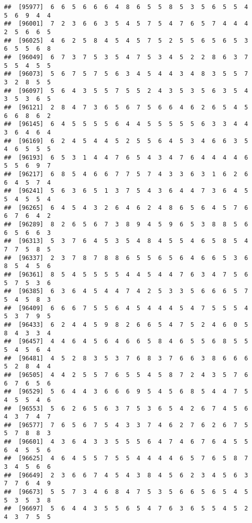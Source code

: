 \documentclass[
]{book}
\begin{document}
\begin{verbatim}
##  [95977]  6  6  5  6  6  6  4  8  6  5  5  8  5  3  5  6  5  5  4  5  6  9  4  4
##  [96001]  7  2  3  6  6  3  5  4  5  7  5  4  7  6  5  7  4  4  4  2  5  6  6  5
##  [96025]  4  6  2  5  8  4  5  4  5  7  5  2  5  5  6  5  6  5  3  6  5  5  6  8
##  [96049]  6  7  3  7  5  3  5  4  7  5  3  4  5  2  2  8  6  3  7  5  5  4  5  5
##  [96073]  5  6  7  5  7  5  6  3  4  5  4  4  3  4  8  3  5  5  7  3  2  8  5  5
##  [96097]  5  6  4  3  5  5  7  5  5  2  4  3  5  3  5  6  3  5  4  3  5  3  6  5
##  [96121]  2  8  4  7  3  6  5  6  7  5  6  6  4  6  2  6  5  4  5  6  6  8  6  2
##  [96145]  6  4  5  5  5  5  6  4  4  5  5  5  5  5  6  3  3  4  4  3  6  4  6  4
##  [96169]  6  2  4  5  4  4  5  2  5  5  6  4  5  3  4  6  6  3  5  4  6  5  5  5
##  [96193]  6  5  3  1  4  4  7  6  5  4  3  4  7  6  4  4  4  4  6  5  5  6  9  7
##  [96217]  6  8  5  4  6  6  7  7  5  7  4  3  3  6  3  1  6  2  6  6  4  5  7  4
##  [96241]  5  6  3  6  5  1  3  7  5  4  3  6  4  4  7  3  6  4  5  5  4  5  5  4
##  [96265]  6  4  5  4  3  2  6  4  6  2  4  8  6  5  6  4  5  7  6  6  7  6  4  2
##  [96289]  8  2  6  5  6  7  3  8  9  4  5  9  6  5  3  8  8  5  6  6  5  6  6  3
##  [96313]  5  3  7  6  4  5  3  5  4  8  4  5  5  4  6  5  8  5  4  7  7  5  8  5
##  [96337]  2  3  7  8  7  8  8  6  5  5  6  5  6  4  6  6  5  3  6  8  5  4  5  6
##  [96361]  8  5  4  5  5  5  5  4  4  5  4  4  7  6  3  4  7  5  6  5  7  5  3  6
##  [96385]  6  3  6  4  5  4  4  7  4  2  5  3  3  5  6  6  6  5  7  5  4  5  8  3
##  [96409]  6  6  6  7  5  5  6  4  5  4  4  4  5  4  7  5  5  5  4  5  3  7  9  5
##  [96433]  6  2  4  4  5  9  8  2  6  6  5  4  7  5  2  4  6  0  5  8  4  3  3  4
##  [96457]  4  4  6  4  5  6  4  6  6  5  8  4  6  5  5  6  8  5  5  5  4  5  6  4
##  [96481]  4  5  2  8  3  5  3  7  6  8  3  7  6  6  3  8  6  6  6  5  2  8  4  4
##  [96505]  4  4  2  5  5  7  6  5  5  4  5  8  7  2  4  3  5  7  6  6  7  6  5  6
##  [96529]  5  6  4  4  3  6  6  6  9  5  4  5  6  8  5  4  4  7  5  4  5  5  4  6
##  [96553]  5  6  2  6  5  6  3  7  5  3  6  5  4  2  6  7  4  5  6  4  3  7  4  7
##  [96577]  7  6  5  6  7  5  4  3  3  7  4  6  2  7  6  2  6  7  5  5  7  8  8  3
##  [96601]  4  3  6  4  3  3  5  5  5  6  4  7  4  6  7  6  4  5  5  6  4  5  5  6
##  [96625]  4  6  4  5  5  7  5  5  4  4  4  4  6  5  7  6  5  8  7  3  4  5  6  6
##  [96649]  2  3  6  6  7  4  5  4  3  8  4  5  6  2  3  4  5  6  3  7  7  6  4  9
##  [96673]  5  5  7  3  4  6  8  4  7  5  3  5  6  6  5  6  5  4  5  5  3  5  3  8
##  [96697]  5  6  4  4  3  5  5  6  5  4  7  6  3  6  5  5  4  5  2  4  3  7  5  5

\end{verbatim}
\end{document}
